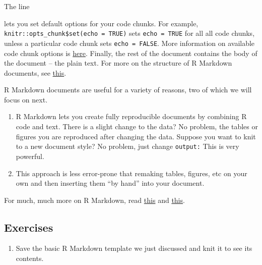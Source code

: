 \documentclass[
]{book}
\newenvironment{Shaded}{\begin{snugshade}}{\end{snugshade}}
\newcommand{\NormalTok}[1]{#1}
\providecommand{\tightlist}{%
  \setlength{\itemsep}{0pt}\setlength{\parskip}{0pt}}
\begin{document}
The line

\begin{Shaded}
\end{Shaded}

lets you set default options for your code chunks. For example, \texttt{knitr::opts\_chunk\$set(echo\ =\ TRUE)} sets \texttt{echo\ =\ TRUE} for all all code chunks, unless a particular code chunk sets \texttt{echo\ =\ FALSE}. More information on available code chunk options is \href{https://yihui.org/knitr/options/}{here}. Finally, the rest of the document contains the body of the document -- the plain text.
For more on the structure of R Markdown documents, see \href{https://bookdown.org/yihui/rmarkdown-cookbook/conceptual-overview.html}{this}.

R Markdown documents are useful for a variety of reasons, two of which we will focus on next.

\begin{enumerate}
\def\labelenumi{\arabic{enumi}.}
\tightlist
\item
  R Markdown lets you create fully reproducible documents by combining R code and text. There is a slight change to the data? No problem, the tables or figures you are reproduced after changing the data. Suppose you want to knit to a new document style? No problem, just change \texttt{output:} This is very powerful.
\item
  This approach is less error-prone that remaking tables, figures, etc on your own and then inserting them ``by hand'' into your document.
\end{enumerate}

For much, much more on R Markdown, read \href{https://bookdown.org/yihui/rmarkdown/}{this} and \href{https://bookdown.org/yihui/rmarkdown-cookbook/}{this}.

\hypertarget{exercises-10}{%
\subsection{Exercises}\label{exercises-10}}

\begin{enumerate}
\def\labelenumi{\arabic{enumi}.}
\tightlist
\item
  Save the basic R Markdown template we just discussed and knit it to see its contents.
\end{enumerate}
\end{document}
